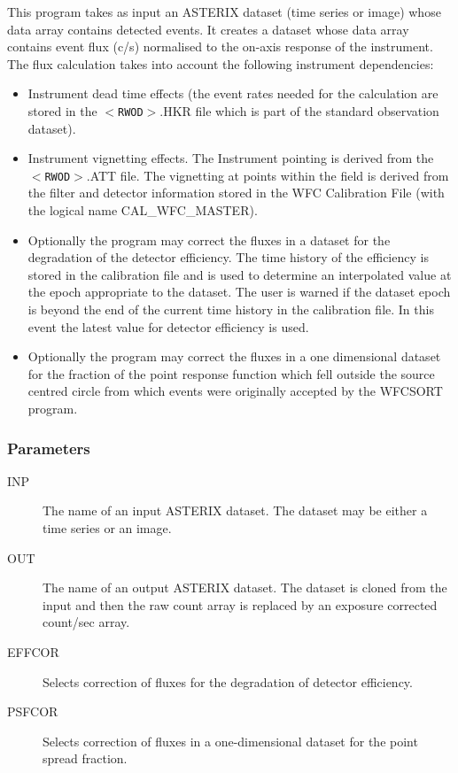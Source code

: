 This program takes as input an ASTERIX dataset (time series or image)
whose data array contains detected events. It creates
a dataset whose data array contains event flux (c/s) normalised
to the on-axis response of the instrument. The flux calculation takes
into account the following instrument dependencies:
\begin{itemize}
\item
Instrument dead time effects (the event rates needed for the 
calculation are stored in the $<${\tt RWOD}$>$.HKR file which is part
of the standard observation dataset).
\item
Instrument vignetting effects. The Instrument pointing is derived
from the $<${\tt RWOD}$>$.ATT file. The vignetting at points within the
field is derived from the filter and detector information 
stored in the WFC Calibration File (with the logical name 
CAL\_WFC\_MASTER).
\item
Optionally the program may correct the fluxes in a dataset for the 
degradation of the detector efficiency. The time history of the efficiency
is stored in the calibration file and is used to determine an interpolated
value at the epoch appropriate to the dataset. The user is warned if the
dataset epoch is beyond the end of the current time history in the
calibration file. In this event the latest value for detector efficiency
is used.
\item
Optionally the program may correct the fluxes in a one dimensional dataset 
for the fraction of the point response function which fell outside the source 
centred circle from which events were originally accepted by the WFCSORT
program.
\end{itemize}
\subsubsection{Parameters}
\begin{description}
\item[INP]
The name of an input ASTERIX dataset. The dataset may be either a time series
or an image.
\item[OUT]
The name of an output ASTERIX dataset. The dataset is cloned from the input and 
then the raw count array is replaced by an exposure corrected 
count/sec array.
\item[EFFCOR]
Selects correction of fluxes for the degradation of detector efficiency.
\item[PSFCOR]
Selects correction of fluxes in a one-dimensional dataset for the point
spread fraction.
\end{description}

